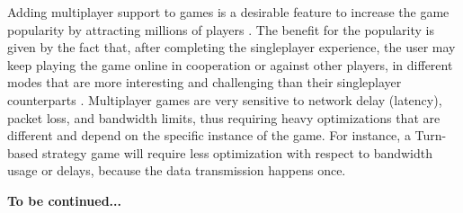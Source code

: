 Adding multiplayer support to games is a desirable feature to increase the game popularity by attracting millions of players \cite{ducheneaut2006alone}. The benefit for the popularity is given by the fact that, after completing the singleplayer experience, the user may keep playing the game online in cooperation or against other players, in different modes that are more interesting and challenging than their singleplayer counterparts \cite{pantel2002impact}. Multiplayer games are very sensitive to network delay (latency), packet loss, and bandwidth limits, thus requiring heavy optimizations that are different and depend on the specific instance of the game. For instance, a Turn-based strategy game will require less optimization with respect to bandwidth usage or delays, because the data transmission happens once.

\textbf{To be continued...}